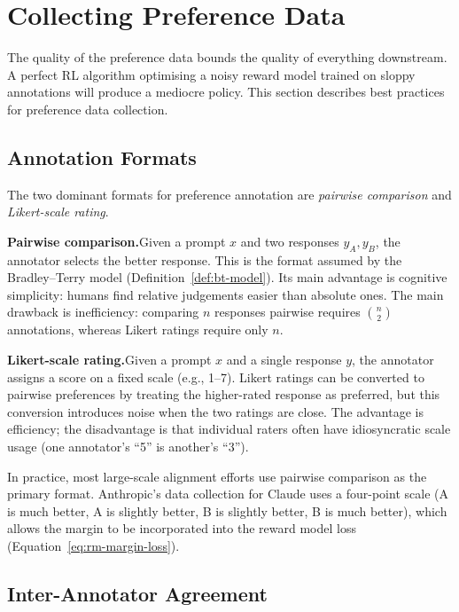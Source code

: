 \section{Collecting Preference Data}
\label{sec:collecting-preferences}

The quality of the preference data bounds the quality of everything downstream. A perfect RL algorithm optimising a noisy reward model trained on sloppy annotations will produce a mediocre policy. This section describes best practices for preference data collection.

\subsection{Annotation Formats}

The two dominant formats for preference annotation are \emph{pairwise comparison} and \emph{Likert-scale rating}.

\textbf{Pairwise comparison.}\quad Given a prompt $x$ and two responses $y_A, y_B$, the annotator selects the better response. This is the format assumed by the Bradley--Terry model (Definition~\ref{def:bt-model}). Its main advantage is cognitive simplicity: humans find relative judgements easier than absolute ones. The main drawback is inefficiency: comparing $n$ responses pairwise requires $\binom{n}{2}$ annotations, whereas Likert ratings require only $n$.

\textbf{Likert-scale rating.}\quad Given a prompt $x$ and a single response $y$, the annotator assigns a score on a fixed scale (e.g., 1--7). Likert ratings can be converted to pairwise preferences by treating the higher-rated response as preferred, but this conversion introduces noise when the two ratings are close. The advantage is efficiency; the disadvantage is that individual raters often have idiosyncratic scale usage (one annotator's ``5'' is another's ``3'').

In practice, most large-scale alignment efforts use pairwise comparison as the primary format. Anthropic's data collection for Claude uses a four-point scale (A is much better, A is slightly better, B is slightly better, B is much better), which allows the margin to be incorporated into the reward model loss (Equation~\eqref{eq:rm-margin-loss}).

\subsection{Inter-Annotator Agreement}

